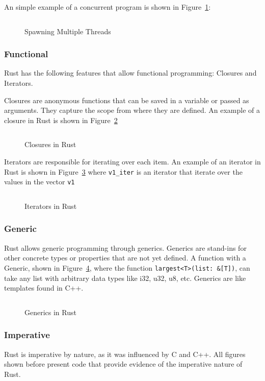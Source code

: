 \documentclass{article}
\newcommand{\rust}[1]{\inputminted{rust}{samples/rust/#1.rs}}
\newcommand{\rustin}[1]{\texttt{#1}}
\begin{document}
  An simple example of a concurrent program is shown in Figure~\ref{fig:thread}:

  \begin{figure}[ht]
    \rust{thread}
    \caption{Spawning Multiple Threads}
    \label{fig:thread}
  \end{figure}

  \subsubsection{Functional}
  Rust has the following features that allow functional programming: Closures
  and Iterators.

  Closures are anonymous functions that can be saved in a variable or passed as
  arguments. They capture the scope from where they are defined. An example of a
  closure in Rust is shown in Figure~\ref{fig:closure}

  \begin{figure}[ht]
    \rust{thread}
    \caption{Closures in Rust}
    \label{fig:closure}
  \end{figure}

  Iterators are responsible for iterating over each item. An example of an
  iterator in Rust is shown in Figure~\ref{fig:iterator} where \rustin{v1_iter}
  is an iterator that iterate over the values in the vector \rustin{v1}

  \begin{figure}[ht]
    \rust{iterator}
    \caption{Iterators in Rust}
    \label{fig:iterator}
  \end{figure}

  \subsubsection{Generic}
  Rust allows generic programming through generics. Generics are stand-ins for
  other concrete types or properties that are not yet defined. A function with a
  Generic, shown in Figure~\ref{fig:generic}, where the function
  \rustin{largest<T>(list: &[T])}, can take any list with arbitrary data types
  like i32, u32, u8, etc. Generics are like templates found in C++.

  \begin{figure}[ht]
    \rust{iterator}
    \caption{Generics in Rust}
    \label{fig:generic}
  \end{figure}


  \subsubsection{Imperative}
  Rust is imperative by nature, as it was influenced by C and C++. All figures
  shown before present code that provide evidence of the imperative nature of
  Rust.
\end{document}
